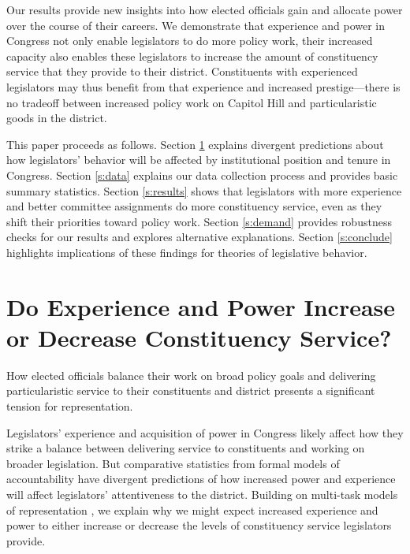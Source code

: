 \documentclass[12pt]{article}
\begin{document}
Our results provide new insights into how elected officials gain and allocate power over the course of their careers. We demonstrate that experience and power in Congress not only enable legislators to do more policy work, their increased capacity also enables these legislators to increase the amount of constituency service that they provide to their district. Constituents with experienced legislators may thus benefit from that experience and increased prestige---there is no tradeoff between increased policy work on Capitol Hill and particularistic goods in the district. 


This paper proceeds as follows. Section \ref{s:theory} explains divergent predictions about how legislators' behavior will be affected by institutional position and tenure in Congress. Section \ref{s:data} explains our data collection process and provides basic summary statistics. Section \ref{s:results} shows that legislators with more experience and better committee assignments do more constituency service, even as they shift their priorities toward policy work. Section \ref{s:demand} provides robustness checks for our results and explores alternative explanations. Section \ref{s:conclude} highlights implications of these findings for theories of legislative behavior.

\section{Do Experience and Power Increase or Decrease Constituency Service?} \label{s:theory}

How elected officials balance their work on broad policy goals and delivering particularistic service to their constituents and district presents a significant tension for representation.

Legislators' experience and acquisition of power in Congress likely affect how they strike a balance between delivering service to constituents and working on broader legislation. But comparative statistics from formal models of accountability have divergent predictions of how increased power and experience will affect legislators' attentiveness to the district. Building on multi-task models of representation \citep{AshworthBuenodeMesquita2006, gordon2009advantages}, we explain why we might expect increased experience and power to either increase or decrease the levels of constituency service legislators provide.
\end{document}

